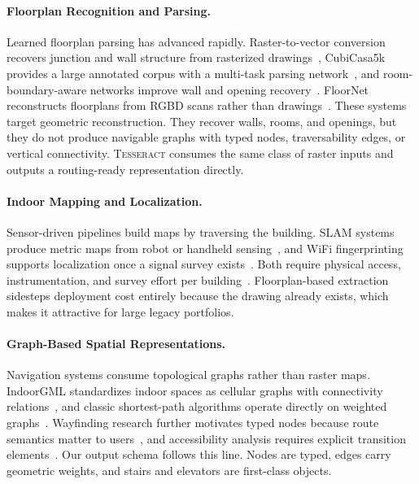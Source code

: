 \documentclass[manuscript,screen,review]{acmart}
\newcommand{\tesseract}{\textsc{Tesseract}}
\begin{document}
\paragraph{Floorplan Recognition and Parsing.}
Learned floorplan parsing has advanced rapidly. Raster-to-vector conversion recovers junction and wall structure from rasterized drawings~\cite{raster_to_vector}, CubiCasa5k provides a large annotated corpus with a multi-task parsing network~\cite{cubicasa}, and room-boundary-aware networks improve wall and opening recovery~\cite{floorplan_parsing_deep}. FloorNet reconstructs floorplans from RGBD scans rather than drawings~\cite{floornet}. These systems target geometric reconstruction. They recover walls, rooms, and openings, but they do not produce navigable graphs with typed nodes, traversability edges, or vertical connectivity. \tesseract{} consumes the same class of raster inputs and outputs a routing-ready representation directly.

\paragraph{Indoor Mapping and Localization.}
Sensor-driven pipelines build maps by traversing the building. SLAM systems produce metric maps from robot or handheld sensing~\cite{slam_survey}, and WiFi fingerprinting supports localization once a signal survey exists~\cite{wifi_fingerprinting}. Both require physical access, instrumentation, and survey effort per building~\cite{indoor_navigation_survey}. Floorplan-based extraction sidesteps deployment cost entirely because the drawing already exists, which makes it attractive for large legacy portfolios.

\paragraph{Graph-Based Spatial Representations.}
Navigation systems consume topological graphs rather than raster maps. IndoorGML standardizes indoor spaces as cellular graphs with connectivity relations~\cite{indoorgml}, and classic shortest-path algorithms operate directly on weighted graphs~\cite{dijkstra, astar}. Wayfinding research further motivates typed nodes because route semantics matter to users~\cite{wayfinding}, and accessibility analysis requires explicit transition elements~\cite{accessibility_analysis}. Our output schema follows this line. Nodes are typed, edges carry geometric weights, and stairs and elevators are first-class objects.
\end{document}
